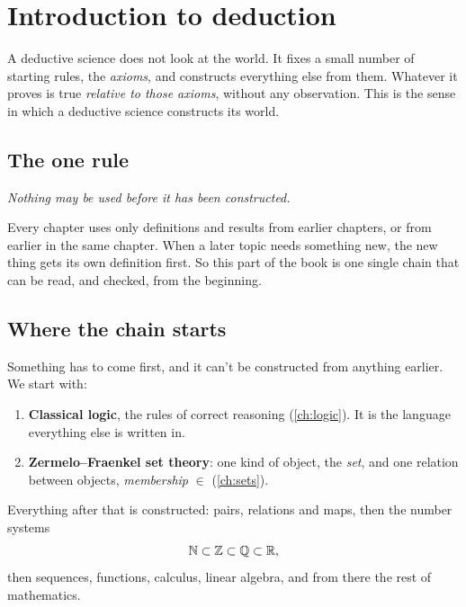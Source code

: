 \chapter*{Introduction to deduction}
\label{intro:deduction}

A deductive science does not look at the world. It fixes a small number of
starting rules, the \emph{axioms}, and constructs everything else from them.
Whatever it proves is true \emph{relative to those axioms}, without any
observation. This is the sense in which a deductive science constructs its world.

\section*{The one rule}

\begin{center}
  \emph{Nothing may be used before it has been constructed.}
\end{center}

\noindent Every chapter uses only definitions and results from earlier chapters, or
from earlier in the same chapter. When a later topic needs something new, the new
thing gets its own definition first. So this part of the book is one single
chain that can be read, and checked, from the beginning.

\section*{Where the chain starts}

Something has to come first, and it can't be constructed from anything earlier.
We start with:
\begin{enumerate}
  \item \textbf{Classical logic}, the rules of correct reasoning
    (\cref{ch:logic}). It is the language everything else is written in.
  \item \textbf{Zermelo--Fraenkel set theory}: one kind of object, the
    \emph{set}, and one relation between objects, \emph{membership} $\in$
    (\cref{ch:sets}).
\end{enumerate}
Everything after that is constructed: pairs, relations and maps, then the number
systems
\[
  \mathbb{N} \subset \mathbb{Z} \subset \mathbb{Q} \subset \mathbb{R},
\]
then sequences, functions, calculus, linear algebra, and from there the rest of
mathematics.

